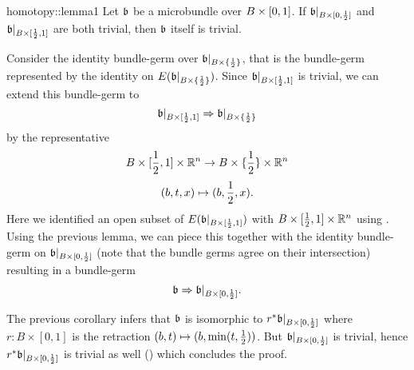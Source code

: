 \begin{scope}
    \newcommand{\bbleft} {
        \bb\restr{B \times{} [0, \half]}
    }
    \newcommand{\bbright} {
        \bb\restr{B \times{} [\half, 1]}
    }
    \newcommand{\bbhalf} {
        \bb\restr{B \times{} \coll{\half{}}}
    }

    \begin{mylemma}{homotopy::lemma1}
        Let $\mathfrak{b}$ be a microbundle over $B \times{} [0, 1]$. If $\bbleft$ and $\bbright$ are both trivial,
        then $\mathfrak{b}$ itself is trivial.
    \end{mylemma}

    \begin{myproof}
        Consider the identity bundle-germ over $\bbhalf$, that is the bundle-germ represented by the identity on $E(\bbhalf)$.
        Since $\bbright$ is trivial, we can extend this bundle-germ to 
        \[ \germ{\bbright}{\bbhalf} \]
        by the representative
        \[ B \times [\frac{1}{2}, 1] \times \mathbb{R}^n \to B \times \{\frac{1}{2}\} \times \mathbb{R}^n \]
        \[ (b, t, x) \mapsto (b, \frac{1}{2}, x). \]
        Here we identified an open subset of $E(\mathfrak{b}\vert_{B \times [\frac{1}{2}, 1]})$ with $B \times [\frac{1}{2}, 1] \times \mathbb{R}^n$ using .
        Using the previous lemma, we can piece this together with the identity bundle-germ on $\bbleft$ (note that the bundle germs agree on their intersection) resulting in a bundle-germ
        \[ \germ{\bb}{\bbleft}. \]

        The previous corollary infers that $\mathfrak{b}$ is isomorphic to $\ind{r}\bbleft$ where $r: B \times [0, 1]$ is the retraction $(b, t) \mapsto (b, \min(t, \frac{1}{2}))$.
        But $\bbleft$ is trivial, hence $\ind{r}\bbleft$ is trivial as well () which concludes the proof.
    \end{myproof}
\end{scope}